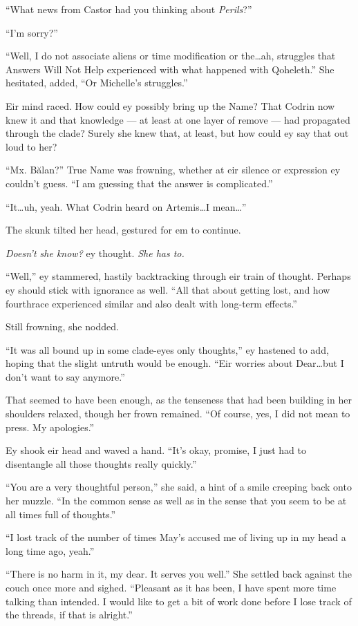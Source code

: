 ``What news from Castor had you thinking about \emph{Perils}?''

``I'm sorry?''

``Well, I do not associate aliens or time modification or the\ldots ah, struggles that Answers Will Not Help experienced with what happened with Qoheleth.'' She hesitated, added, ``Or Michelle's struggles.''

Eir mind raced. How could ey possibly bring up the Name? That Codrin now knew it and that knowledge — at least at one layer of remove — had propagated through the clade? Surely she knew that, at least, but how could ey say that out loud to her?

``Mx. Bălan?'' True Name was frowning, whether at eir silence or expression ey couldn't guess. ``I am guessing that the answer is complicated.''

``It\ldots uh, yeah. What Codrin heard on Artemis\ldots I mean\ldots{}''

The skunk tilted her head, gestured for em to continue.

\emph{Doesn't she know?} ey thought. \emph{She has to.}

``Well,'' ey stammered, hastily backtracking through eir train of thought. Perhaps ey should stick with ignorance as well. ``All that about getting lost, and how fourthrace experienced similar and also dealt with long-term effects.''

Still frowning, she nodded.

``It was all bound up in some clade-eyes only thoughts,'' ey hastened to add, hoping that the slight untruth would be enough. ``Eir worries about Dear\ldots but I don't want to say anymore.''

That seemed to have been enough, as the tenseness that had been building in her shoulders relaxed, though her frown remained. ``Of course, yes, I did not mean to press. My apologies.''

Ey shook eir head and waved a hand. ``It's okay, promise, I just had to disentangle all those thoughts really quickly.''

``You are a very thoughtful person,'' she said, a hint of a smile creeping back onto her muzzle. ``In the common sense as well as in the sense that you seem to be at all times full of thoughts.''

``I lost track of the number of times May's accused me of living up in my head a long time ago, yeah.''

``There is no harm in it, my dear. It serves you well.'' She settled back against the couch once more and sighed. ``Pleasant as it has been, I have spent more time talking than intended. I would like to get a bit of work done before I lose track of the threads, if that is alright.''

